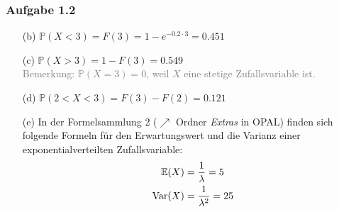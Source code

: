 \documentclass[ngerman,t]{beamer}
\DeclareMathOperator{\Var}{Var}
\newcommand{\E}{\mathbb{E}}
\begin{document}
	\begin{frame}
		\frametitle{Aufgabe 1.2}
		\begin{itemize}
			\item[(b)] $\mathbb{P}(X < 3) = F(3) = 1 - e^{-0.2\cdot 3} = 0.451$
			\pause
			\item[(c)] $\mathbb{P}(X > 3) = 1 - F(3) = 0.549$ \\ \textcolor{gray}{Bemerkung: $\mathbb{P}(X = 3) = 0$, weil $X$ eine stetige Zufallsvariable ist.}
			\pause
			\item[(d)] $\mathbb{P}(2 < X < 3) = F(3) - F(2) = 0.121$
			\pause
			\item[(e)] In der Formelsammlung 2 ($\nearrow$ Ordner \textit{Extras} in OPAL) finden sich folgende Formeln für den Erwartungswert und die Varianz einer exponentialverteilten Zufallsvariable:
			\begin{align}
				\E(X) &= \frac{1}{\lambda} = 5 \notag \\
				\Var(X) &= \frac{1}{\lambda^2} = 25 \notag
			\end{align}
		\end{itemize}
	\end{frame}
\end{document}
